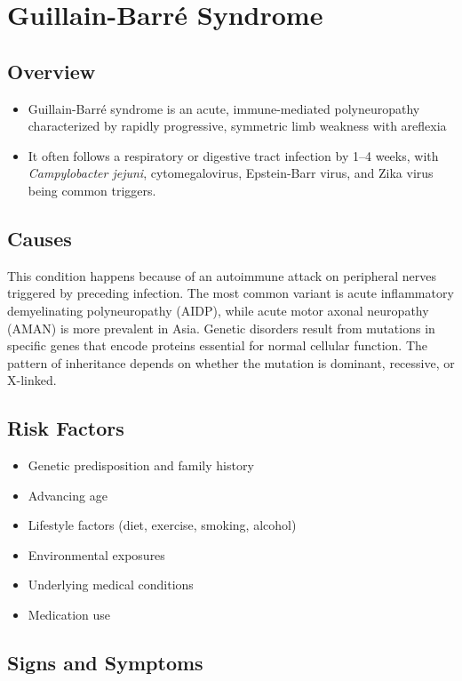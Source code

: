 \chapter{Guillain-Barr\'{e} Syndrome}
\label{sec:Guillain-Barré Syndrome}

\section{Overview}


\begin{itemize}[noitemsep]
  \item Guillain-Barr\'{e} syndrome is an acute, immune-mediated polyneuropathy characterized by rapidly progressive, symmetric limb weakness with areflexia
  \item It often follows a respiratory or digestive tract infection by 1--4 weeks, with \textit{Campylobacter jejuni}, cytomegalovirus, Epstein-Barr virus, and Zika virus being common triggers.
\end{itemize}
\section{Causes}
This condition happens because of an autoimmune attack on peripheral nerves triggered by preceding infection. The most common variant is acute inflammatory demyelinating polyneuropathy (AIDP), while acute motor axonal neuropathy (AMAN) is more prevalent in Asia. Genetic disorders result from mutations in specific genes that encode proteins essential for normal cellular function. The pattern of inheritance depends on whether the mutation is dominant, recessive, or X-linked.   
\section{Risk Factors}

\begin{itemize}[noitemsep]
  \item Genetic predisposition and family history
  \item Advancing age
  \item Lifestyle factors (diet, exercise, smoking, alcohol)
  \item Environmental exposures
  \item Underlying medical conditions
  \item Medication use
\end{itemize}
\section{Signs and Symptoms}

